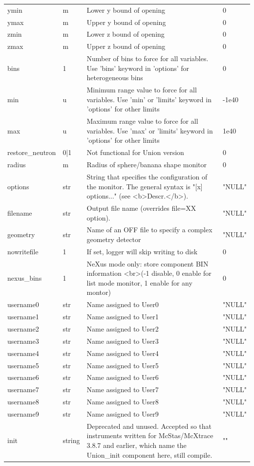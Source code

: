 \begin{longtable}{p{}p{}p{}p{}}
ymin & m & Lower y bound of opening & 0 \\
ymax & m & Upper y bound of opening & 0 \\
zmin & m & Lower z bound of opening & 0 \\
zmax & m & Upper z bound of opening & 0 \\
bins & 1 & Number of bins to force for all variables. Use 'bins' keyword in 'options' for heterogeneous bins & 0 \\
min & u & Minimum range value to force for all variables. Use 'min' or 'limits' keyword in 'options' for other limits & -1e40 \\
max & u & Maximum range value to force for all variables. Use 'max' or 'limits' keyword in 'options' for other limits & 1e40 \\
restore\_neutron & 0|1 & Not functional for Union version & 0 \\
radius & m & Radius of sphere/banana shape monitor & 0 \\
options & str & String that specifies the configuration of the monitor. The general syntax is "[x] options..." (see \textless{}b\textgreater{}Descr.\textless{}/b\textgreater{}). & "NULL" \\
filename & str & Output file name (overrides file=XX option). & "NULL" \\
geometry & str & Name of an OFF file to specify a complex geometry detector & "NULL" \\
nowritefile & 1 & If set, logger will skip writing to disk & 0 \\
nexus\_bins & 1 & NeXus mode only: store component BIN information \textless{}br\textgreater{}(-1 disable, 0 enable for list mode monitor, 1 enable for any montor) & 0 \\
username0 & str & Name assigned to User0 & "NULL" \\
username1 & str & Name assigned to User1 & "NULL" \\
username2 & str & Name assigned to User2 & "NULL" \\
username3 & str & Name assigned to User3 & "NULL" \\
username4 & str & Name assigned to User4 & "NULL" \\
username5 & str & Name assigned to User5 & "NULL" \\
username6 & str & Name assigned to User6 & "NULL" \\
username7 & str & Name assigned to User7 & "NULL" \\
username8 & str & Name assigned to User8 & "NULL" \\
username9 & str & Name assigned to User9 & "NULL" \\
init & string & Deprecated and unused. Accepted so that instruments written for McStas/McXtrace 3.8.7 and earlier, which name the Union\_init component here, still compile. & "" \\
\bottomrule
\end{longtable}

